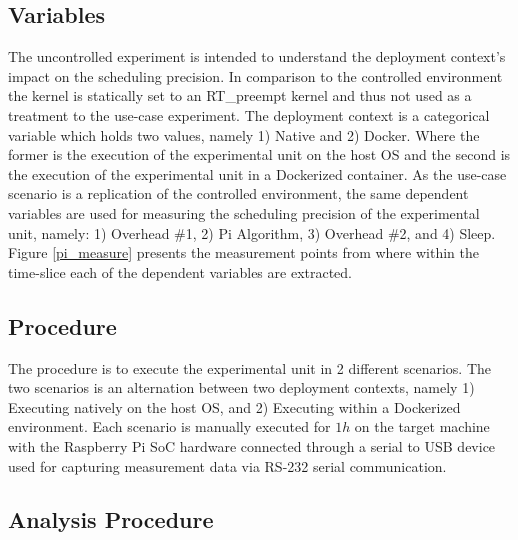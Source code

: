 \subsection{Variables}

The uncontrolled experiment is intended to understand the deployment context's impact on the scheduling precision. In comparison to the controlled environment the kernel is statically set to an RT\_preempt kernel and thus not used as a treatment to the use-case experiment. The deployment context is a categorical variable which holds two values, namely 1) Native and 2) Docker. Where the former is the execution of the experimental unit on the host OS and the second is the execution of the experimental unit in a Dockerized container. As the use-case scenario is a replication of the controlled environment, the same dependent variables are used for measuring the scheduling precision of the experimental unit, namely: 1) Overhead \#1, 2) Pi Algorithm, 3) Overhead \#2, and 4) Sleep. Figure \ref{pi_measure} presents the measurement points from where within the time-slice each of the dependent variables are extracted.\\


\subsection{Procedure}

The procedure is to execute the experimental unit in 2 different scenarios. The two scenarios is an alternation between two deployment contexts, namely 1) Executing natively on the host OS, and 2) Executing within a Dockerized environment. Each scenario is manually executed for $1h$ on the target machine with the Raspberry Pi SoC \cite{raspberry} hardware connected through a serial to USB device used for capturing measurement data via RS-232 serial communication.\\


\subsection{Analysis Procedure}

